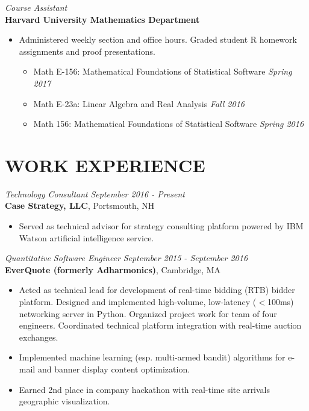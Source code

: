 \documentclass{res}
\begin{document}
\begin{resume}
    {\sl Course Assistant} \\
    \textbf{Harvard University Mathematics Department}
    \begin{itemize} \itemsep -2.5pt
        \item Administered weekly section and office hours. Graded student R homework
            assignments and proof presentations.
        \begin{itemize} \itemsep -2.5pt
            \item Math E-156: Mathematical Foundations of Statistical Software \hfill {\sl Spring 2017}
            \item Math E-23a: Linear Algebra and Real Analysis \hfill {\sl Fall 2016}
            \item Math 156: Mathematical Foundations of Statistical Software \hfill {\sl Spring 2016}
        \end{itemize} 
    \end{itemize} 

  
\section{WORK EXPERIENCE}
    {\sl Technology Consultant} \hfill {\sl September 2016 - Present} \\
    \textbf{Case Strategy, LLC}, Portsmouth, NH
    \begin{itemize}  \itemsep -2.5pt
        \item Served as technical advisor for strategy consulting platform
            powered by IBM Watson artificial intelligence service.
    \end{itemize}

    {\sl Quantitative Software Engineer} \hfill {\sl September 2015 - September 2016} \\
    \textbf{EverQuote (formerly Adharmonics)}, Cambridge, MA 
    \begin{itemize}  \itemsep -2.5pt
        \item Acted as technical lead for development of real-time bidding
            (RTB) bidder platform. Designed and implemented high-volume,
            low-latency ($<$100ms) networking server in Python. Organized
            project work for team of four engineers.  Coordinated technical
            platform integration with real-time auction exchanges.
        \item Implemented machine learning (esp. multi-armed bandit) algorithms
            for e-mail and banner display content optimization. 
         \item Earned 2nd place in company hackathon with real-time site
            arrivals geographic visualization.
    \end{itemize}


\end{resume}
\end{document}
